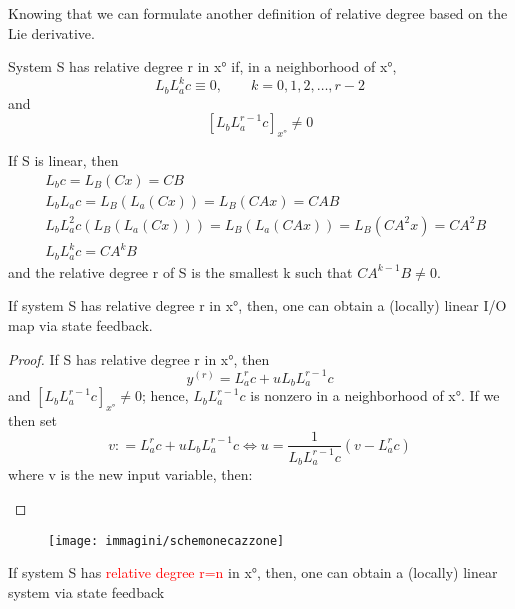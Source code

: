 Knowing that we can formulate another definition of relative degree based on the Lie derivative.
\begin{defn}
	System S has relative degree r in x° if, in a neighborhood of x°, \[L_bL_a^kc\equiv 0,\qquad k=0,1,2,	\dots,r-2\] and \[[L_bL_a^{r-1}c]_{x°}\neq 0\]
\end{defn}
\begin{remark}
	If S is linear, then
	\[
	\begin{aligned}
		&L_bc=L_B(Cx)=CB\\
		&L_bL_ac=L_B(L_a(Cx))=L_B(CAx)=CAB\\
		&L_bL_a^2c(L_B(L_a(Cx)))=L_B(L_a(CAx))=L_B(CA^2x)=CA^2B\\
		&L_bL_a^kc=CA^kB
	\end{aligned}
	\] and the relative degree r of S is the smallest k such that $CA^{k-1}B\neq0$.
\end{remark}
\begin{thm}
	If system S has relative degree r in x°, then, one can obtain a (locally) linear I/O map via state feedback.
\end{thm}

\begin{proof}
	If S has relative degree r in x°, then \[y^{(r)}=L_a^rc+uL_bL_a^{r-1}c\] and $[L_bL_a^{r-1}c]_{x°}\neq0$; hence, $L_bL_a^{r-1}c$ is nonzero in a neighborhood of x°. If we then set 
	\[
	v\colon=L_a^rc+uL_bL_a^{r-1}c \Leftrightarrow 
	u=\frac{1}{L_bL_a^{r-1}c}(v-L_a^rc)
	\] 
	where v is the new input variable, then:
	\begin{center}
	\end{center}
\end{proof}
\begin{figure}[H]
	\centering
	\texttt{[image: immagini/schemonecazzone]}
	\label{fig:schemonecazzone}
\end{figure}
\begin{thm}
	If system S has \textcolor{red}{relative degree r=n} in x°, then, one can obtain a (locally) linear system via state feedback
\end{thm}
